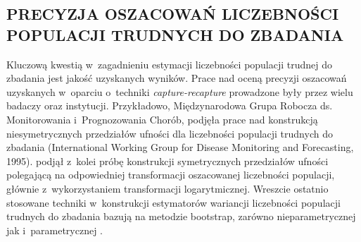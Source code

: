 \documentclass[12pt,a4paper]{article}
\begin{document}



\begin{center}
\section*{PRECYZJA OSZACOWAŃ LICZEBNOŚCI POPULACJI TRUDNYCH DO ZBADANIA}
\end{center}

Kluczową kwestią w~zagadnieniu estymacji liczebności populacji trudnej do zbadania jest jakość uzyskanych wyników.  Prace nad oceną precyzji oszacowań uzyskanych w~oparciu o~techniki \textit{capture-recapture} prowadzone były przez wielu badaczy oraz instytucji. Przykładowo, Międzynarodowa Grupa Robocza ds. Monitorowania i~Prognozowania Chorób, podjęła prace nad konstrukcją niesymetrycznych przedziałów ufności dla liczebności populacji trudnych do zbadania (International Working Group for Disease Monitoring and Forecasting, 1995). \citet{chao1989estimating} podjął z~kolei próbę konstrukcji symetrycznych przedziałów ufności polegającą na odpowiedniej transformacji oszacowanej liczebności populacji, głównie z~wykorzystaniem transformacji logarytmicznej. Wreszcie ostatnio stosowane techniki w~konstrukcji estymatorów wariancji liczebności populacji trudnych do zbadania bazują na metodzie bootstrap, zarówno nieparametrycznej jak i~parametrycznej \citep{buckland1991quantifying,gemmell2004capture}.
\end{document}
